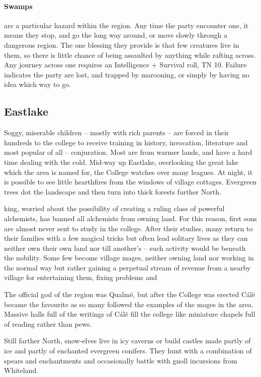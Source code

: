 \begin{multicols}{2}
\paragraph{Swamps} are a particular hazard within the region.
Any time the party encounter one, it means they stop, and go the long way around, or move slowly through a dangerous region.
The one blessing they provide is that few creatures live in them, so there is little chance of being assaulted by anything while rafting across.
Any journey across one requires an Intelligence + Survival roll, TN 10.
Failure indicates the party are lost, and trapped by marooning, or simply by having no idea which way to go.

\subsection{Eastlake}

Soggy, miserable children -- mostly with rich parents -- are forced in their hundreds to the \gls{college} to receive training in history, invocation, literature and most popular of all -- conjuration.
Most are from warmer lands, and have a hard time dealing with the cold.
Mid-way up Eastlake, overlooking the great lake which the area is named for, the College watches over many leagues.
At night, it is possible to see little hearthfires from the windows of village cottages.
Evergreen trees dot the landscape and then turn into thick forests further North.

\Gls{king}, worried about the possibility of creating a ruling class of powerful alchemists, has banned all alchemists from owning land.
For this reason, first sons are almost never sent to study in the college.
After their studies, many return to their families with a few magical tricks but often lead solitary lives as they can neither own their own land nor till another's -- such activity would be beneath the nobility.
Some few become village mages, neither owning land nor working in the normal way but rather gaining a perpetual stream of revenue from a nearby village for entertaining them, fixing problems and 

The official god of the region was Qualm\"{e}, but after the College was erected C\'{a}l\"{e} became the favourite as so many followed the examples of the mages in the area.
Massive halls full of the writings of C\'{a}l\"{e} fill the college like miniature chapels full of reading rather than pews.

Still farther North, snow-elves live in icy caverns or build castles made partly of ice and partly of enchanted evergreen conifers.
They hunt with a combination of spears and enchantments and occasionally battle with gnoll incursions from Whiteland.


\end{multicols}
